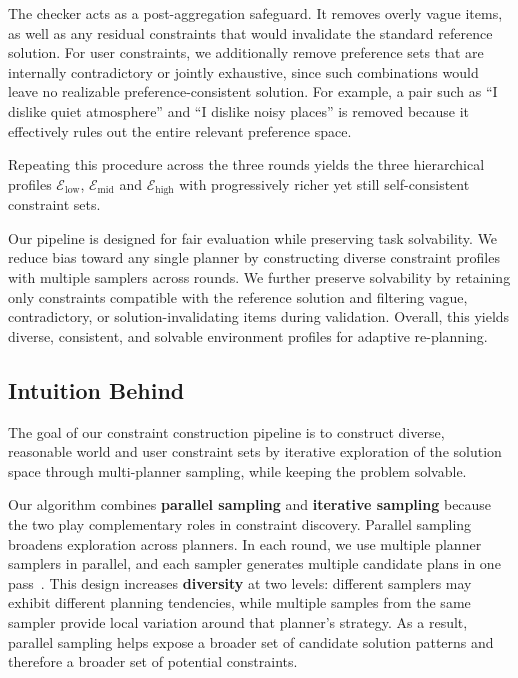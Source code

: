 \documentclass{llmxive}
\begin{document}
The checker acts as a post-aggregation safeguard. It removes overly vague items, as well as any residual constraints that would invalidate the standard reference solution. For user constraints, we additionally remove preference sets that are internally contradictory or jointly exhaustive, since such combinations would leave no realizable preference-consistent solution. For example, a pair such as ``I dislike quiet atmosphere'' and ``I dislike noisy places'' is removed because it effectively rules out the entire relevant preference space.

Repeating this procedure across the three rounds yields the three hierarchical profiles
$\mathcal{E}_{\mathrm{low}}$, $\mathcal{E}_{\mathrm{mid}}$ and $\mathcal{E}_{\mathrm{high}}$ with progressively richer yet still self-consistent constraint sets. 

Our pipeline is designed for fair evaluation while preserving task solvability. We reduce bias toward any single planner by constructing diverse constraint profiles with multiple samplers across rounds. We further preserve solvability by retaining only constraints compatible with the reference solution and filtering vague, contradictory, or solution-invalidating items during validation. Overall, this yields diverse, consistent, and solvable environment profiles for adaptive re-planning.

\subsection{Intuition Behind}
\label{app:env_cons_intuition}

The goal of our constraint construction pipeline is to construct diverse, reasonable world and user constraint sets by iterative exploration of the solution space through multi-planner sampling, while keeping the problem solvable.

Our algorithm combines \textbf{parallel sampling} and \textbf{iterative sampling} because the two play complementary roles in constraint discovery.
Parallel sampling broadens exploration across planners. 
In each round, we use multiple planner samplers in parallel, and each sampler generates multiple candidate plans in one pass~\citep{verbalized-sampling}. 
This design increases \textbf{diversity} at two levels: different samplers may exhibit different planning tendencies, while multiple samples from the same sampler provide local variation around that planner's strategy. 
As a result, parallel sampling helps expose a broader set of candidate solution patterns and therefore a broader set of potential constraints.
\end{document}
